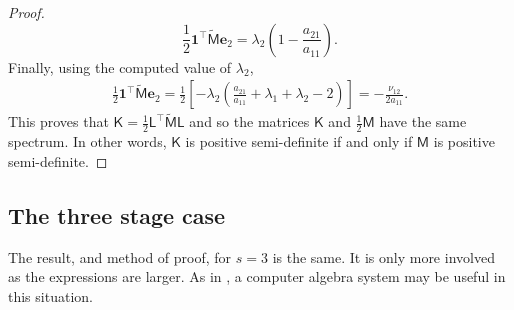 \documentclass{amsart}
\newcommand{\msfM}{\mathsf{M}}
\newcommand{\msfK}{\mathsf{K}}
\newcommand{\msfL}{\mathsf{L}}
\newcommand{\bfone }{\mathbf{1}}
\newcommand{\bfe}{\boldsymbol{e}}
\theoremstyle{definition}
\begin{document}
\begin{proof}
\[    \frac{1}{2} \bfone^\top \tilde{\msfM} \bfe_2 = \lambda_2 \left( 1 - \frac{ a_{21} }{ a_{11} } \right).
  \]
  Finally, using the computed value of $\lambda_2$,
  \begin{align*}
    \frac{1}{2} \bfone^\top \tilde{\msfM} \bfe_2 = \frac{1}{2} \left[ -\lambda_2 \left( \frac{a_{21}}{a_{11}} + \lambda_1 + \lambda_2 - 2 \right) \right] = -\frac{\nu_{12}}{2a_{11}}.
  \end{align*}
  This proves that $\msfK = \frac{1}{2} \msfL^\top \tilde{\msfM} \msfL$ and so the matrices $\msfK$ and $\frac12\msfM$ have the same spectrum. In other words, $\msfK$ is positive semi-definite if and only if $\msfM$ is positive semi-definite.
\end{proof}

\subsection{The three stage case}

The result, and method of proof, for $s=3$ is the same. It is only more involved as the expressions are larger. As in \cite{MR4673496}, a computer algebra system may be useful in this situation.
\end{document}
